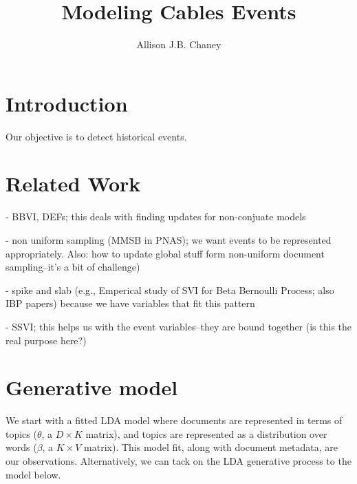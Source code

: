 





\title{Modeling Cables Events}

\author{Allison J.B. Chaney}

\maketitle

\section{Introduction}

Our objective is to detect historical events.

\section{Related Work}

- BBVI, DEFs; this deals with finding updates for non-conjuate models

- non uniform sampling (MMSB in PNAS); we want events to be represented
appropriately.  Also: how to update global stuff form non-uniform document
sampling--it's a bit of challenge)

- spike and slab (e.g., Emperical study of SVI for Beta Bernoulli Process; also
IBP papers) because we have variables that fit this pattern

- SSVI; this helps us with the event variables--they are bound together (is
this the real purpose here?)


\section{Generative model} We start with a fitted LDA model where documents
are represented in terms of topics ($\theta$, a $D \times K$ matrix), and
topics are represented as a distribution over words ($\beta$, a $K \times V$
matrix).  This model fit, along with document metadata, are our observations.
Alternatively, we can tack on the LDA generative process to the model below.

